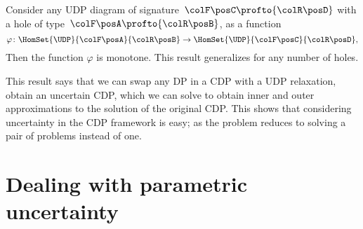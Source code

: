 \begin{proposition}\label{prop:udpsem-monotone}
    Consider any UDP diagram of signature~${\colF\posC }\profto {\colR\posD}$ with a hole
    of type~${\colF\posA} \profto {\colR\posB}$, as a function
    \begin{equation}
        \varphi\colon \HomSet{\UDP}{\colF\posA}{\colR\posB} \to \HomSet{\UDP}{\colF\posC}{\colR\posD},
    \end{equation}
    Then the function $\varphi$ is monotone.
    This result generalizes for any number of holes.
\end{proposition}



This result says that we can swap any DP in a CDP with a UDP relaxation, obtain an uncertain CDP, which we can solve to obtain inner and outer approximations to the solution of the original CDP.
This shows that considering uncertainty in the CDP framework is easy; as the problem reduces to solving a pair of problems instead of one.

\section[Parametric uncertainty]{Dealing with parametric uncertainty}
\label{sec:Applications}

